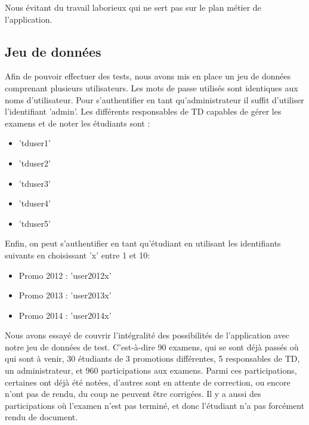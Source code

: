 \documentclass{report}
\begin{document}
      Nous évitant du travail laborieux qui ne sert pas sur le plan métier de
      l'application.
      
    \subsection{Jeu de données}
        Afin de pouvoir effectuer des tests, nous avons mis en place un jeu de
        données comprenant plusieurs utilisateurs. Les mots de passe utilisés
        sont identiques aux noms d'utilisateur.
        Pour s'authentifier en tant qu'administrateur il suffit d'utiliser
        l'identifiant 'admin'.
        Les différents responsables de TD capables de gérer les examens et de
        noter les étudiants sont :
        
        \begin{itemize}
          \item{'tduser1'}
          \item{'tduser2'}
          \item{'tduser3'}
          \item{'tduser4'}
          \item{'tduser5'}
        \end{itemize}
        
        Enfin, on peut s'authentifier en tant qu'étudiant en utilisant les
        identifiants suivants en choisissant 'x' entre 1 et 10:
        
        \begin{itemize}
          \item{Promo 2012 : 'user2012x'}
          \item{Promo 2013 : 'user2013x'}
          \item{Promo 2014 : 'user2014x'}
        \end{itemize}
        
        Nous avons essayé de couvrir l'intégralité des possibilités de l'application
        avec notre jeu de données de test. C'est-à-dire 90 examens, qui se sont
        déjà passés où qui sont à venir, 30 étudiants de 3 promotions différentes,
        5 responsables de TD, un administrateur, et 960 participations aux examens.
        Parmi ces participations, certaines ont déjà été notées, d'autres sont en 
        attente de correction, ou encore n'ont pas de rendu, du coup ne peuvent
        être corrigées. Il y a aussi des participations où l'examen n'est pas terminé,
        et donc l'étudiant n'a pas forcément rendu de document.
\end{document}

